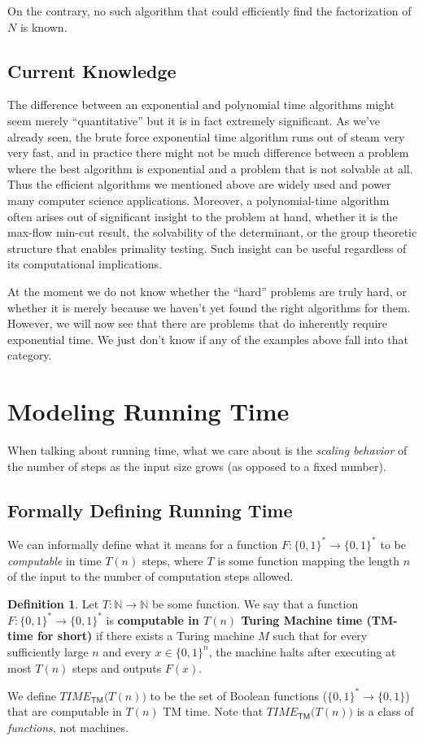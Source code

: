 \documentclass[a4paper, 12pt]{report}
\theoremstyle{remark}
\theoremstyle{definition}
\newtheorem{definition}{Definition}[section]
\begin{document}
On the contrary, no such algorithm that could efficiently find the factorization of $N$ is known. 

\subsection{Current Knowledge}
The difference between an exponential and polynomial time algorithms might seem merely “quantitative” but it is in fact extremely significant. As we’ve already seen, the brute force exponential time algorithm runs out of steam very very fast, and in practice there might not be much difference between a problem where the best algorithm is exponential and a problem that is not solvable at all. Thus the efficient algorithms we mentioned above are widely used and power many computer science applications. Moreover, a polynomial-time algorithm often arises out of significant insight to the problem at hand, whether it is the max-flow min-cut result, the solvability of the determinant, or the group theoretic structure that enables primality testing. Such insight can be useful regardless of its computational implications. 

At the moment we do not know whether the “hard” problems are truly hard, or whether it is merely because we haven’t yet found the right algorithms for them. However, we will now see that there are problems that do inherently require exponential time. We just don’t know if any of the examples above fall into that category. 

\section{Modeling Running Time}
When talking about running time, what we care about is the \textit{scaling behavior} of the number of steps as the input size grows (as opposed to a fixed number). 

\subsection{Formally Defining Running Time}
We can informally define what it means for a function $F: \{0,1\}^* \longrightarrow \{0,1\}^*$ to be \textit{computable} in time $T(n)$ steps, where $T$ is some function mapping the length $n$ of the input to the number of computation steps allowed. 

\begin{definition}
Let $T: \mathbb{N} \longrightarrow \mathbb{N}$ be some function. We say that a function $F: \{0,1\}^* \longrightarrow \{0,1\}^*$ is \textbf{computable in $T(n)$ Turing Machine time (TM-time for short)} if there exists a Turing machine $M$ such that for every sufficiently large $n$ and every $x \in \{0,1\}^n$, the machine halts after executing at most $T(n)$ steps and outputs $F(x)$. 

We define $TIME_{\mathsf{TM}}\big(T(n)\big)$ to be the set of Boolean functions ($\{0,1\}^* \longrightarrow \{0,1\}$) that are computable in $T(n)$ TM time. Note that $TIME_{\mathsf{TM}}\big(T(n)\big)$ is a class of \textit{functions}, not machines. 
\end{definition}
\end{document}
